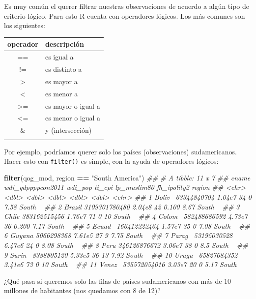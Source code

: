 \documentclass[]{book}
\newenvironment{Shaded}{\begin{snugshade}}{\end{snugshade}}
\newcommand{\CommentTok}[1]{\textcolor[rgb]{0.56,0.35,0.01}{\textit{#1}}}
\newcommand{\KeywordTok}[1]{\textcolor[rgb]{0.13,0.29,0.53}{\textbf{#1}}}
\newcommand{\NormalTok}[1]{#1}
\newcommand{\OperatorTok}[1]{\textcolor[rgb]{0.81,0.36,0.00}{\textbf{#1}}}
\newcommand{\StringTok}[1]{\textcolor[rgb]{0.31,0.60,0.02}{#1}}
\begin{document}
Es muy común el querer filtrar nuestras observaciones de acuerdo a algún
tipo de criterio lógico. Para esto R cuenta con operadores lógicos. Los
más comunes son los siguientes:

\begin{longtable}[]{@{}cl@{}}
\toprule
operador & descripción\tabularnewline
\midrule
\endhead
== & es igual a\tabularnewline
!= & es distinto a\tabularnewline
\textgreater{} & es mayor a\tabularnewline
\textless{} & es menor a\tabularnewline
\textgreater{}= & es mayor o igual a\tabularnewline
\textless{}= & es menor o igual a\tabularnewline
\& & y (intersección)\tabularnewline
&\tabularnewline
\bottomrule
\end{longtable}

Por ejemplo, podríamos querer solo los países (observaciones)
sudamericanos. Hacer esto con \texttt{filter()} es simple, con la ayuda
de operadores lógicos:

\begin{Shaded}
\begin{Highlighting}[]
\KeywordTok{filter}\NormalTok{(qog_mod, region }\OperatorTok{==}\StringTok{ "South America"}\NormalTok{)}
\CommentTok{## # A tibble: 11 x 7}
\CommentTok{##    cname  wdi_gdppppcon2011 wdi_pop ti_cpi lp_muslim80 fh_ipolity2 region }
\CommentTok{##    <chr>              <dbl>   <dbl>  <dbl>       <dbl>       <dbl> <chr>  }
\CommentTok{##  1 Boliv~       63344840704  1.04e7     34       0            7.58 South ~}
\CommentTok{##  2 Brazil     3109301780480  2.04e8     42       0.100        8.67 South ~}
\CommentTok{##  3 Chile       383162515456  1.76e7     71       0           10    South ~}
\CommentTok{##  4 Colom~      582488686592  4.73e7     36       0.200        7.17 South ~}
\CommentTok{##  5 Ecuad~      166412222464  1.57e7     35       0            7.08 South ~}
\CommentTok{##  6 Guyana        5066298368  7.61e5     27       9            7.75 South ~}
\CommentTok{##  7 Parag~       53195030528  6.47e6     24       0            8.08 South ~}
\CommentTok{##  8 Peru        346126876672  3.06e7     38       0            8.5  South ~}
\CommentTok{##  9 Surin~        8388805120  5.33e5     36      13            7.92 South ~}
\CommentTok{## 10 Urugu~       65827684352  3.41e6     73       0           10    South ~}
\CommentTok{## 11 Venez~      535572054016  3.03e7     20       0            5.17 South ~}
\end{Highlighting}
\end{Shaded}

¿Qué pasa si queremos solo las filas de países sudamericanos con más de
10 millones de habitantes (nos quedamos con 8 de 12)?
\end{document}
